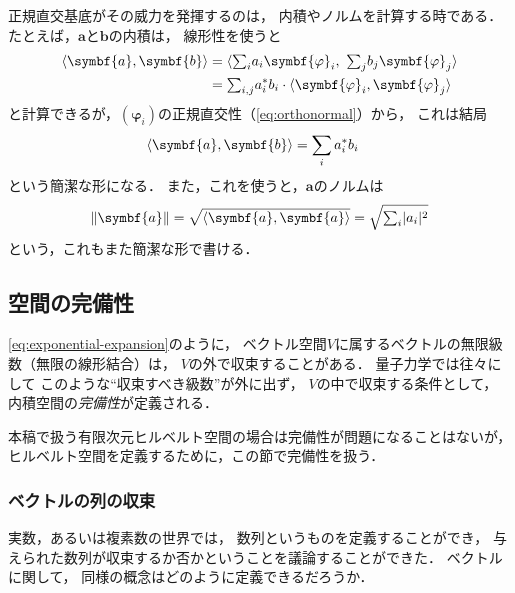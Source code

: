 \documentclass[
]{sotsu}
\newcommand{\bphi}{\symbf{\varphi}}
\begin{document}
正規直交基底がその威力を発揮するのは，
内積やノルムを計算する時である．
たとえば，$\symbf{a}$と$\symbf{b}$の内積は，
線形性を使うと
\begin{equation*}
    \begin{split}
        \iparen{\symbf{a}, \symbf{b}}
        &= \iparen{{\textstyle \sum_i} a_i \bphi_i, \  {\textstyle \sum_j} b_j \bphi_j}
        \\
        &= {\textstyle \sum_{i, j}} \conj{a_i} b_i \cdot \iparen{\bphi_i, \bphi_j}
    \end{split}
\end{equation*}
と計算できるが，$(\bphi_i)$の正規直交性（\cref{eq:orthonormal}）から，
これは結局
\begin{equation*}
    \begin{split}
        \iparen{\symbf{a}, \symbf{b}}
        &= \sum_i \conj{a_i} b_i
    \end{split}
\end{equation*}
という簡潔な形になる．
また，これを使うと，$\symbf{a}$のノルムは
\begin{equation*}
    \norm{\symbf{a}}
    = \sqrt{\iparen{\symbf{a}, \symbf{a}}}
    = \sqrt{{\textstyle \sum_i} \abs{a_i}^2}
\end{equation*}
という，これもまた簡潔な形で書ける．





\subsection{空間の完備性}

\cref{eq:exponential-expansion}のように，
ベクトル空間$V$に属するベクトルの無限級数（無限の線形結合）は，
$V$の外で収束することがある．
量子力学では往々にして
このような``収束すべき級数''が外に出ず，
$V$の中で収束する条件として，
内積空間の\emph{完備性}が定義される．

本稿で扱う有限次元ヒルベルト空間の場合は完備性が問題になることはないが，
ヒルベルト空間を定義するために，この節で完備性を扱う．



\subsubsection{ベクトルの列の収束}

実数，あるいは複素数の世界では，
数列というものを定義することができ，
与えられた数列が収束するか否かということを議論することができた．
ベクトルに関して，
同様の概念はどのように定義できるだろうか．
\end{document}
